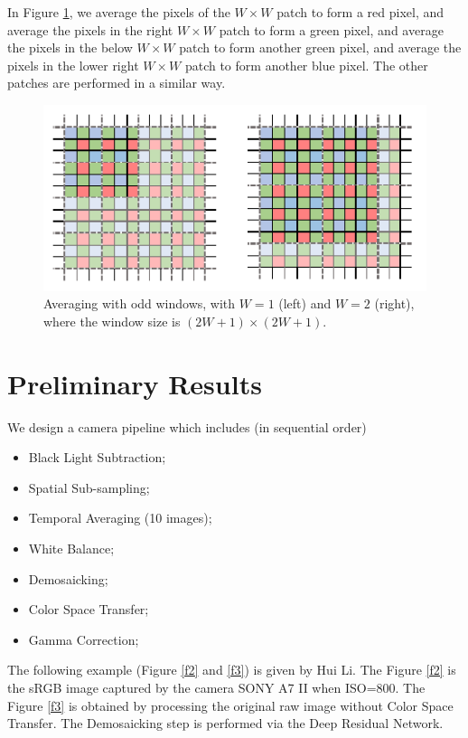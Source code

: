 \documentclass[10pt,twocolumn,letterpaper]{article}
\begin{document}
In Figure \ref{f1}, we average the pixels of the $W\times W$ patch to form a red pixel, and average the pixels in the right $W\times W$ patch to form a green pixel, and average the pixels in the below $W\times W$ patch to form another green pixel, and average the pixels in the lower right $W\times W$ patch to form another blue pixel. The other patches are performed in a similar way. 

\begin{figure}
\centering
\includegraphics[width=0.95\linewidth]{CFA.png}
\caption{Averaging with odd windows, with $W = 1$ (left) and $W = 2$ (right),
where the window size is $(2W + 1)\times (2W + 1)$.
}
\label{f1}
\end{figure}


\section{Preliminary Results}
We design a camera pipeline which includes (in sequential order)
\begin{itemize}
\item Black Light Subtraction;
\item Spatial Sub-sampling; 
\item Temporal Averaging (10 images);
\item White Balance;
\item Demosaicking;
\item Color Space Transfer;
\item Gamma Correction;
\end{itemize}

The following example (Figure \ref{f2} and \ref{f3}) is given by Hui Li. The Figure \ref{f2} is the sRGB image captured by the camera SONY A7 II when ISO=800. The Figure \ref{f3} is obtained by processing the original raw image without Color Space Transfer. The Demosaicking step is performed via the Deep Residual Network.
\end{document}
